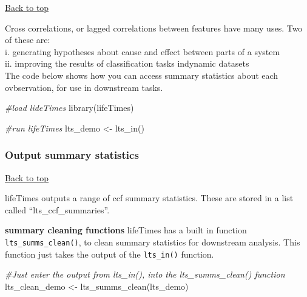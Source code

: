\documentclass[
]{article}
\newenvironment{Shaded}{\begin{snugshade}}{\end{snugshade}}
\newcommand{\CommentTok}[1]{\textcolor[rgb]{0.56,0.35,0.01}{\textit{#1}}}
\newcommand{\FunctionTok}[1]{\textcolor[rgb]{0.00,0.00,0.00}{#1}}
\newcommand{\NormalTok}[1]{#1}
\newcommand{\OtherTok}[1]{\textcolor[rgb]{0.56,0.35,0.01}{#1}}
\newcommand{\SpecialCharTok}[1]{\textcolor[rgb]{0.00,0.00,0.00}{#1}}
\begin{document}
\protect\hyperlink{}{Back to top}

Cross correlations, or lagged correlations between features have many
uses. Two of these are:\\
i. generating hypotheses about cause and effect between parts of a
system\\
ii. improving the results of classification tasks indynamic datasets\\

The code below shows how you can access summary statistics about each
ovbservation, for use in downstream tasks.

\begin{Shaded}
\begin{Highlighting}[]
\CommentTok{\#load lideTimes}
\FunctionTok{library}\NormalTok{(lifeTimes)}

\CommentTok{\#run lifeTimes}
\NormalTok{lts\_demo }\OtherTok{\textless{}{-}} \FunctionTok{lts\_in}\NormalTok{()}
\end{Highlighting}
\end{Shaded}

\hypertarget{output-summary-statistics}{%
\subsubsection{\texorpdfstring{\textbf{Output summary
statistics}}{Output summary statistics}}\label{output-summary-statistics}}

\protect\hyperlink{}{Back to top}

lifeTimes outputs a range of ccf summary statistics. These are stored in
a list called ``lts\_ccf\_summaries''.

\begin{Shaded}
\end{Shaded}

\textbf{summary cleaning functions} lifeTimes has a built in function
\texttt{lts\_summs\_clean()}, to clean summary statistics for downstream
analysis. This function just takes the output of the \texttt{lts\_in()}
function.

\begin{Shaded}
\begin{Highlighting}[]
\CommentTok{\#Just enter the output from lts\_in(), into the lts\_summs\_clean() function}
\NormalTok{lts\_clean\_demo }\OtherTok{\textless{}{-}} \FunctionTok{lts\_summs\_clean}\NormalTok{(lts\_demo)}
\end{Highlighting}
\end{Shaded}
\end{document}
